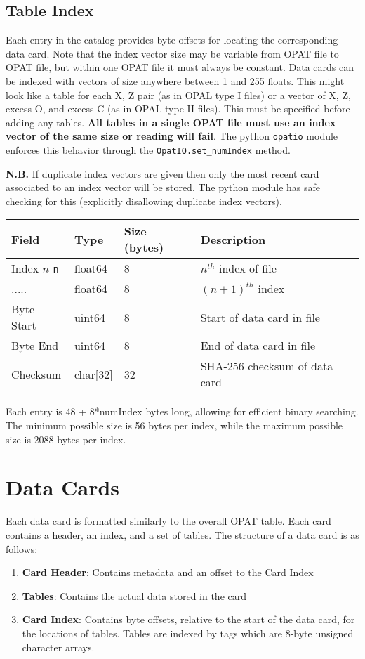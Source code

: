 \documentclass{article}
\begin{document}
\subsection{Table Index}
Each entry in the catalog provides byte offsets for locating the
corresponding data card.  Note that the index vector size may be
variable from OPAT file to OPAT file, but within one OPAT file it must always be
constant.  Data cards can be indexed with vectors of size anywhere between 1 and
255 floats.  This might look like a table for each X, Z pair (as in OPAL type I
files) or a vector of X, Z, excess O, and excess C (as in OPAL type II files). 
This must be specified before adding any tables.  \textbf{All tables in a single
OPAT file must use an index vector of the same size or reading will fail}.  The python
\texttt{opatio} module enforces this behavior through the
\texttt{OpatIO.set\_numIndex} method. 

\noindent\textbf{N.B.} If duplicate index vectors are given then only the most
recent card associated to an index vector will be stored.  The python module
has safe checking for this (explicitly disallowing duplicate index vectors). 
\begin{longtable}{|l|l|l|l|}
\hline
\textbf{Field} & \textbf{Type} & \textbf{Size (bytes)} & \textbf{Description} \\
\hline
Index $n$ \texttt{n} & float64 & 8 & $n^{th}$ index of file \\
..... & float64 & 8 & $(n+1)^{th}$ index \\
Byte Start & uint64 & 8 & Start of data card in file \\
Byte End & uint64 & 8 & End of data card in file \\
Checksum & char[32] & 32 & SHA-256 checksum of data card \\
\hline
\end{longtable} 

Each entry is 48 + 8*numIndex bytes long, allowing for efficient binary
searching.  The minimum possible size is 56 bytes per index, while the maximum
possible size is 2088 bytes per index. 

\section{Data Cards}\label{Sec:Cards}
Each data card is formatted similarly to the overall OPAT table.  Each card contains a header, an index, and a set of tables.  The structure of a data card is as follows: 
\begin{enumerate}
  \item \textbf{Card Header}: Contains metadata and an offset to the Card Index
  \item \textbf{Tables}: Contains the actual data stored in the card
  \item \textbf{Card Index}: Contains byte offsets, relative to the start of the data card, for the locations of tables.  Tables are indexed by tags which are 8-byte unsigned character arrays. 
\end{enumerate}
\end{document}
